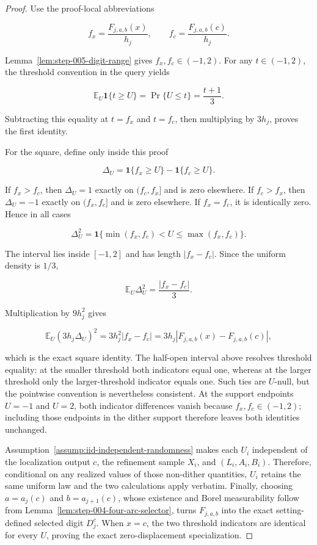 \begin{proof}
Use the proof-local abbreviations

\[
f_x=\frac{F_{j,a,b}(x)}{h_j},
\qquad
f_c=\frac{F_{j,a,b}(c)}{h_j}.
\]

Lemma~\ref{lem:step-005-digit-range} gives \(f_x,f_c\in(-1,2)\). For any \(t\in(-1,2)\), the threshold convention in the query yields

\[
\mathbb E_U\mathbf 1\{t\geq U\}
=\Pr\{U\leq t\}
=\frac{t+1}{3}.
\]

Subtracting this equality at \(t=f_x\) and \(t=f_c\), then multiplying by \(3h_j\), proves the first identity.

For the square, define only inside this proof

\[
\Delta_U=\mathbf 1\{f_x\geq U\}-\mathbf 1\{f_c\geq U\}.
\]

If \(f_x>f_c\), then \(\Delta_U=1\) exactly on \((f_c,f_x]\) and is zero elsewhere. If \(f_c>f_x\), then \(\Delta_U=-1\) exactly on \((f_x,f_c]\) and is zero elsewhere. If \(f_x=f_c\), it is identically zero. Hence in all cases

\[
\Delta_U^2
=\mathbf 1\{\min(f_x,f_c)<U\leq\max(f_x,f_c)\}.
\]

The interval lies inside \([-1,2]\) and has length \(|f_x-f_c|\). Since the uniform density is \(1/3\),

\[
\mathbb E_U\Delta_U^2=\frac{|f_x-f_c|}{3}.
\]

Multiplication by \(9h_j^2\) gives

\[
\mathbb E_U(3h_j\Delta_U)^2
=3h_j^2|f_x-f_c|
=3h_j|F_{j,a,b}(x)-F_{j,a,b}(c)|,
\]

which is the exact square identity. The half-open interval above resolves threshold equality: at the smaller threshold both indicators equal one, whereas at the larger threshold only the larger-threshold indicator equals one. Such ties are \(U\)-null, but the pointwise convention is nevertheless consistent. At the support endpoints \(U=-1\) and \(U=2\), both indicator differences vanish because \(f_x,f_c\in(-1,2)\); including those endpoints in the dither support therefore leaves both identities unchanged.

Assumption~\ref{assump:iid-independent-randomness} makes each \(U_i\) independent of the localization output \(c\), the refinement sample \(X_i\), and \((L_i,A_i,B_i)\). Therefore, conditional on any realized values of those non-dither quantities, \(U_i\) retains the same uniform law and the two calculations apply verbatim. Finally, choosing \(a=a_j(c)\) and \(b=a_{j+1}(c)\), whose existence and Borel measurability follow from Lemma~\ref{lem:step-004-four-arc-selector}, turns \(F_{j,a,b}\) into the exact setting-defined selected digit \(D_j^c\). When \(x=c\), the two threshold indicators are identical for every \(U\), proving the exact zero-displacement specialization.
\end{proof}

